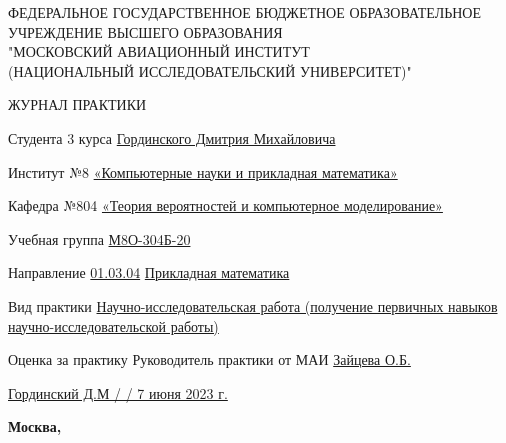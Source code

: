 \begin{titlepage}
\begin{center}
\bfseries

{\Large ФЕДЕРАЛЬНОЕ ГОСУДАРСТВЕННОЕ БЮДЖЕТНОЕ ОБРАЗОВАТЕЛЬНОЕ\\ УЧРЕЖДЕНИЕ ВЫСШЕГО ОБРАЗОВАНИЯ\\ "МОСКОВСКИЙ АВИАЦИОННЫЙ ИНСТИТУТ\\ (НАЦИОНАЛЬНЫЙ ИССЛЕДОВАТЕЛЬСКИЙ УНИВЕРСИТЕТ)"

}

\vspace{56pt}

{\large ЖУРНАЛ ПРАКТИКИ 

}

\end{center}

\vspace{36pt}

Студента 3 курса \hspace{3cm}        \underline{Гординского Дмитрия Михайловича}

\vspace{26pt}

Институт №8 \underline{«Компьютерные науки и прикладная математика»}

\vspace{26pt}

Кафедра №804 \underline{«Теория вероятностей и компьютерное моделирование»}

\vspace{26pt}

Учебная группа \underline{М8О-304Б-20}

\vspace{26pt}

Направление \underline{01.03.04} \hspace{3cm} \underline{Прикладная математика}

\vspace{26pt}

Вид практики \underline{Научно-исследовательская работа (получение первичных навыков научно-исследовательской работы)}

\vspace{26pt}

Оценка за практику \underline{ \hspace{3cm}} Руководитель практики от МАИ \underline{Зайцева О.Б.}

\vspace{46pt}

\underline{Гординский Д.М / \hspace{3cm} / 7 июня 2023 г.}

\vfill

\begin{center}
\bfseries
Москва, \the\year
\end{center}
\end{titlepage}

\pagebreak
